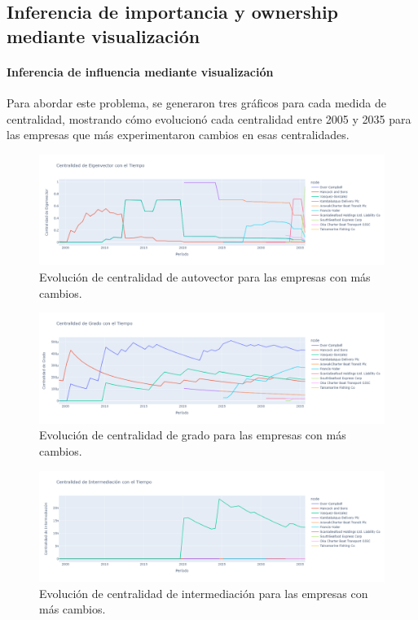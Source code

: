 \documentclass[11pt,spanish,a4paper]{article}
\begin{document}
\subsection{Inferencia de importancia y ownership mediante visualización}

\paragraph{Inferencia de influencia mediante visualización}
Para abordar este problema, se generaron tres gráficos para cada medida de centralidad, mostrando cómo evolucionó cada centralidad entre 2005 y 2035 para las empresas que más experimentaron cambios en esas centralidades.

\begin{figure}[H]
  \centering
  \includegraphics[width=0.7\linewidth]{graphs/eigenvector_centralidad_tiempo.png}
  \caption{Evolución de centralidad de autovector para las empresas con más cambios.}
\end{figure}

\begin{figure}[H]
  \centering
  \includegraphics[width=0.7\linewidth]{graphs/grado_centralidad_tiempo.png}
  \caption{Evolución de centralidad de grado para las empresas con más cambios.}
\end{figure}

\begin{figure}[H]
  \centering
  \includegraphics[width=0.7\linewidth]{graphs/between_centralidad_tiempo.png}
  \caption{Evolución de centralidad de intermediación para las empresas con más cambios.}
\end{figure}
\end{document}
